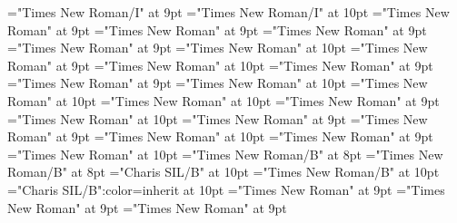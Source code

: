 \documentclass[gps1,twoside]{article}
\begin{document}
\font\translationaftertranslationspanexampleexampleexamplessensesensessensesensesentryexamplespansensespanspandiventryletData="Times New Roman/I" at 9pt
\font\spanentranslationtranslationspanexampleexampleexamplessensesensessensesensesentryexamplespansensespanspandiventryletData="Times New Roman/I" at 10pt
\font\semanticdomainssensesensesentrybeforesensespanspandiventryletData="Times New Roman" at 9pt
\font\semanticdomainssensesensesentryaftersensespanspandiventryletData="Times New Roman" at 9pt
\font\spanspansensespanspandiventryletData="Times New Roman" at 9pt
\font\spanspanspansensespanspandiventryletData="Times New Roman" at 9pt
\font\spanenspanspanspansensespanspandiventryletData="Times New Roman" at 10pt
\font\picturesentryafterdiventryletData="Times New Roman" at 9pt
\font\picturepicturesentryspandiventryletData="Times New Roman" at 10pt
\font\picturepicturesentrypicturepicturesentryspandiventryletData="Times New Roman" at 9pt
\font\picturepicturesentryafterpicturepicturesentryspandiventryletData="Times New Roman" at 9pt
\font\sensenumberpicturepicturesentryspandiventryletData="Times New Roman" at 10pt
\font\spanensensenumberpicturepicturesentryspandiventryletData="Times New Roman" at 10pt
\font\captionpicturepicturesentryspandiventryletData="Times New Roman" at 10pt
\font\spancaptionpicturepicturesentryspandiventryletData="Times New Roman" at 9pt
\font\spanenspancaptionpicturepicturesentryspandiventryletData="Times New Roman" at 10pt
\font\scientificnamesensespanspandiventryletData="Times New Roman" at 9pt
\font\scientificnamesensesensesentryaftersensespanspandiventryletData="Times New Roman" at 9pt
\font\spanenscientificnamesensespanspandiventryletData="Times New Roman" at 10pt
\font\subentriesdiventryletData="Times New Roman" at 9pt
\font\subentrysubentriesentrysubentriesdiventryletData="Times New Roman" at 10pt
\font\headwordsubentrysubentriesentrysubentriesdiventryletData="Times New Roman/B" at 8pt
\font\headwordaftersubentrysubentriesentrysubentriesdiventryletData="Times New Roman/B" at 8pt
\font\spanbzhheadwordsubentrysubentriesentrysubentriesdiventryletData="Charis SIL/B" at 10pt
\font\spanheadwordminorentryvariantlastchildafterheadwordsubentrysubentriesentrysubentriesdiventryletData="Times New Roman/B" at 10pt
\font\aspanbzhheadwordsubentrysubentriesentrysubentriesdiventryletData="Charis SIL/B":color=inherit at 10pt
\font\spansubentrysubentriesentrysubentriesdiventryletData="Times New Roman" at 9pt
\font\complexformtypessubentrysubentriesentryaftersubentrysubentriesentrysubentriesdiventryletData="Times New Roman" at 9pt
\font\complexformtypespansubentrysubentriesentrysubentriesdiventryletData="Times New Roman" at 9pt
\end{document}
